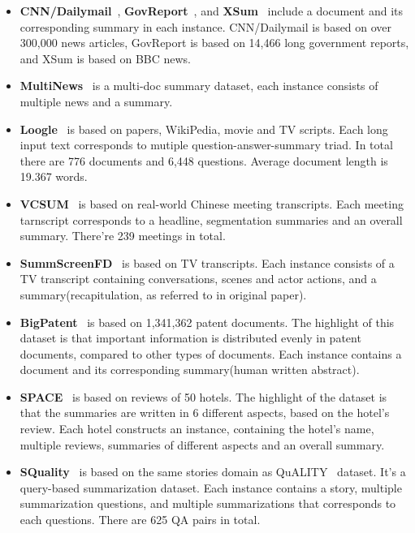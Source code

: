 \begin{itemize}[leftmargin=10pt]
    \item \textbf{CNN/Dailymail}~\cite{nallapati_abstractive_dailymail_2016}, \textbf{GovReport}~\cite{huang_govreport_2021}, and \textbf{XSum}~\cite{narayan_dont_xsum_2018} include a document and its corresponding summary in each instance. CNN/Dailymail is based on over 300,000 news articles, GovReport is based on 14,466 long government reports, and XSum is based on BBC news. 
 \item \textbf{MultiNews}~\cite{fabbri_multi-news:_2019} is a multi-doc summary dataset, each instance consists of multiple news and a summary. 
 \item \textbf{Loogle}~\cite{li_loogle:_2023} is based on papers, WikiPedia, movie and TV scripts. Each long input text corresponds to mutiple question-answer-summary triad. In total there are 776 documents and 6,448 questions. Average document length is 19.367 words. 
 \item \textbf{VCSUM}~\cite{wu_vcsum:_2023} is based on real-world Chinese meeting transcripts. Each meeting tarnscript corresponds to a headline, segmentation summaries and an overall summary. There're 239 meetings in total. 
 \item \textbf{SummScreenFD}~\cite{chen_summscreen:_2021} is based on TV transcripts. Each instance consists of a TV transcript containing conversations, scenes and actor actions, and a summary(recapitulation, as referred to in original paper). 
 \item \textbf{BigPatent}~\cite{sharma_bigpatent:_2019} is based on 1,341,362 patent documents. The highlight of this dataset is that important information is distributed evenly in patent documents, compared to other types of documents. Each instance contains a document and its corresponding summary(human written abstract). 
 \item \textbf{SPACE}~\cite{angelidis_extractive_space_2021} is based on reviews of 50 hotels. The highlight of the dataset is that the summaries are written in 6 different aspects, based on the hotel's review. Each hotel constructs an instance, containing the hotel's name, multiple reviews, summaries of different aspects and an overall summary. 
 \item \textbf{SQuality}~\cite{wang2022squality} is based on the same stories domain as QuALITY~\cite{pang_quality_dataset:_2021} dataset. It's a query-based summarization dataset. Each instance contains a story, multiple summarization questions, and multiple summarizations that corresponds to each questions. There are 625 QA pairs in total. 

\end{itemize}
